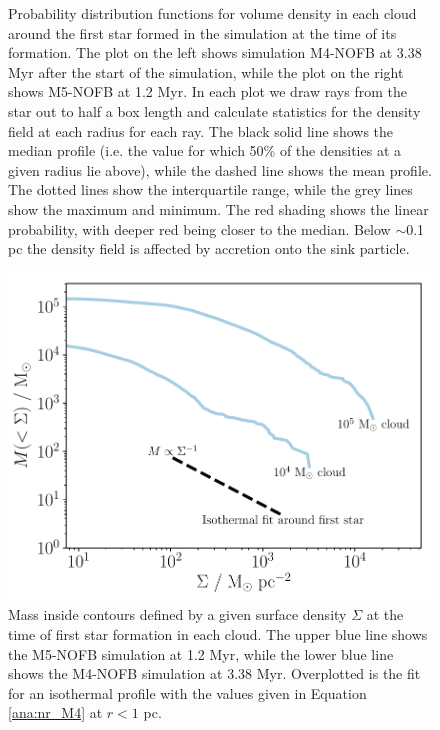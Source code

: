 \documentclass[a4paper,fleqn,usenatbib]{mnras}
\begin{document}
\begin{figure}
\caption{Probability distribution functions for volume density in each cloud around the first star formed in the simulation at the time of its formation. The plot on the left shows simulation M4-NOFB at 3.38 Myr after the start of the simulation, while the plot on the right shows M5-NOFB at 1.2 Myr. In each plot we draw rays from the star out to half a box length and calculate statistics for the density field at each radius for each ray. The black solid line shows the median profile (i.e. the value for which 50\% of the densities at a given radius lie above), while the dashed line shows the mean profile. The dotted lines show the interquartile range, while the grey lines show the maximum and minimum. The red shading shows the linear probability, with deeper red being closer to the median. Below $\sim$0.1 pc the density field is affected by accretion onto the sink particle.}
\label{fig:gradrays}
\end{figure}

\begin{figure}
	\includegraphics[width=\columnwidth]{../plots/cumuldens.pdf}
	\caption{Mass inside contours defined by a given surface density $\Sigma$ at the time of first star formation in each cloud. The upper blue line shows the M5-NOFB simulation at 1.2 Myr, while the lower blue line shows the M4-NOFB simulation at 3.38 Myr. Overplotted is the fit for an isothermal profile with the values given in Equation \ref{ana:nr_M4} at $r < 1$ pc.}
	\label{fig:cumuldens}
\end{figure}
\end{document}
